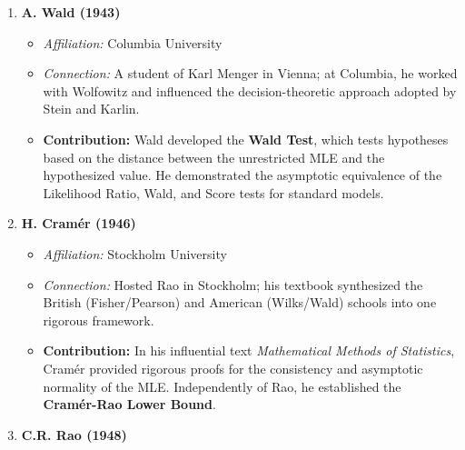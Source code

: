 \documentclass[
  letterpaper,
  DIV=11,
  numbers=noendperiod]{scrreprt}
\providecommand{\tightlist}{%
  \setlength{\itemsep}{0pt}\setlength{\parskip}{0pt}}
\renewcommand{\[}{\begin{equation}}
\renewcommand{\]}{\end{equation}}
\theoremstyle{definition}
\theoremstyle{plain}
\theoremstyle{plain}
\theoremstyle{plain}
\theoremstyle{definition}
\theoremstyle{plain}
\theoremstyle{remark}
\begin{document}
\begin{enumerate}
  \begin{itemize}
  \tightlist
  \item
    \emph{Affiliation:} UCL / University of Manchester
  \item
    \emph{Connection:} A student of Fisher and colleague of Pearson at
    UCL; famously debated with Fisher on conditional inference.
  \item
    \textbf{Contribution:} Bartlett improved the accuracy of the
    Likelihood Ratio Test for small samples. He introduced the
    \textbf{Bartlett Correction}, a scaling factor for the test
    statistic that aligns its expected value with that of the limiting
    Chi-square distribution.
  \end{itemize}
\item
  \textbf{A. Wald (1943)}

  \begin{itemize}
  \tightlist
  \item
    \emph{Affiliation:} Columbia University
  \item
    \emph{Connection:} A student of Karl Menger in Vienna; at Columbia,
    he worked with Wolfowitz and influenced the decision-theoretic
    approach adopted by Stein and Karlin.
  \item
    \textbf{Contribution:} Wald developed the \textbf{Wald Test}, which
    tests hypotheses based on the distance between the unrestricted MLE
    and the hypothesized value. He demonstrated the asymptotic
    equivalence of the Likelihood Ratio, Wald, and Score tests for
    standard models.
  \end{itemize}
\item
  \textbf{H. Cramér (1946)}

  \begin{itemize}
  \tightlist
  \item
    \emph{Affiliation:} Stockholm University
  \item
    \emph{Connection:} Hosted Rao in Stockholm; his textbook synthesized
    the British (Fisher/Pearson) and American (Wilks/Wald) schools into
    one rigorous framework.
  \item
    \textbf{Contribution:} In his influential text \emph{Mathematical
    Methods of Statistics}, Cramér provided rigorous proofs for the
    consistency and asymptotic normality of the MLE. Independently of
    Rao, he established the \textbf{Cramér-Rao Lower Bound}.
  \end{itemize}
\item
  \textbf{C.R. Rao (1948)}


\end{enumerate}
\end{document}
